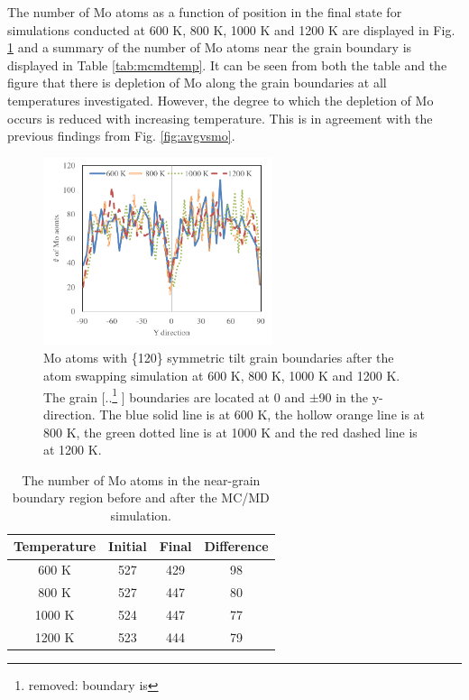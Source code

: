 \documentclass[review]{elsarticle}
\providecommand{\DIFaddtex}[1]{{\protect\color{blue} \sf #1}} %
\providecommand{\DIFdeltex}[1]{{\protect\color{red} [..\footnote{removed: #1} ]}} %
\providecommand{\DIFaddFL}[1]{\DIFadd{#1}} %
\providecommand{\DIFdelFL}[1]{\DIFdel{#1}} %
\providecommand{\DIFaddbeginFL}{} %
\providecommand{\DIFaddendFL}{} %
\providecommand{\DIFdelbeginFL}{} %
\providecommand{\DIFdelendFL}{} %
\providecommand{\DIFadd}[1]{\texorpdfstring{\DIFaddtex{#1}}{#1}} %
\providecommand{\DIFdel}[1]{\texorpdfstring{\DIFdeltex{#1}}{}} %
\newcommand{\DIFscaledelfig}{0.5}
\newlength{\DIFdelgraphicswidth} %
\newlength{\DIFdelgraphicsheight} %
\newcommand{\DIFaddincludegraphics}[2][]{{\color{blue}\fbox{\DIFOincludegraphics[#1]{#2}}}} %
\newcommand{\DIFdelincludegraphics}[2][]{%
\sbox{\DIFdelgraphicsbox}{\DIFOincludegraphics[#1]{#2}}%
\settoboxwidth{\DIFdelgraphicswidth}{\DIFdelgraphicsbox} %
\settoboxtotalheight{\DIFdelgraphicsheight}{\DIFdelgraphicsbox} %
\scalebox{\DIFscaledelfig}{%
\parbox[b]{\DIFdelgraphicswidth}{\usebox{\DIFdelgraphicsbox}\\[-\baselineskip] \rule{\DIFdelgraphicswidth}{0em}}\llap{\resizebox{\DIFdelgraphicswidth}{\DIFdelgraphicsheight}{%
\setlength{\unitlength}{\DIFdelgraphicswidth}%
\begin{picture}(1,1)%
\thicklines\linethickness{2pt} %
{\color[rgb]{1,0,0}\put(0,0){\framebox(1,1){}}}%
{\color[rgb]{1,0,0}\put(0,0){\line( 1,1){1}}}%
{\color[rgb]{1,0,0}\put(0,1){\line(1,-1){1}}}%
\end{picture}%
}\hspace*{3pt}}} %
} %
\DeclareRobustCommand{\DIFaddbeginFL}{\DIFOaddbeginFL \let\includegraphics\DIFaddincludegraphics} %
\DeclareRobustCommand{\DIFaddendFL}{\DIFOaddendFL \let\includegraphics\DIFOincludegraphics} %
\DeclareRobustCommand{\DIFdelbeginFL}{\DIFOdelbeginFL \let\includegraphics\DIFdelincludegraphics} %
\DeclareRobustCommand{\DIFdelendFL}{\DIFOaddendFL \let\includegraphics\DIFOincludegraphics} %
\begin{document}
\FloatBarrier

The number of Mo atoms as a function of position in the final state for simulations conducted at 600 K, 800 K, 1000 K and 1200 K are displayed in Fig. \ref{fig:mcmdtemp} and a summary of the number of Mo atoms near the grain boundary is displayed in Table \ref{tab:mcmdtemp}. It can be seen from both the table and the figure that there is depletion of Mo along the grain boundaries at all temperatures investigated. However, the degree to which the depletion of Mo occurs is reduced with increasing temperature. This is in agreement with the previous findings from Fig. \ref{fig:avgvsmo}. 

\begin{figure}[h]
 \centering
 \includegraphics[width=0.6\textwidth]{mcmdtemp.png} 
 \caption{Mo atoms with \{120\} symmetric tilt grain boundaries after the atom swapping simulation at 600 K, 800 K, 1000 K and 1200 K. The grain \DIFdelbeginFL \DIFdelFL{boundary is }\DIFdelendFL \DIFaddbeginFL \DIFaddFL{boundaries are }\DIFaddendFL located at 0 and $\pm$90 in the y-direction. The blue solid line is at 600 K, the hollow orange line is at 800 K, the green dotted line is at 1000 K and the red dashed line is at 1200 K.}
 \label{fig:mcmdtemp}
\end{figure}

\begin{table}[h]
\caption{The number of Mo atoms in the near-grain boundary region before and after the MC/MD simulation. } \label{tab:mcmdtemp}
\begin{center}
\begin{tabular}{|c|c|c|c|}
	\hline
Temperature & Initial & Final & Difference \\
\hline
600 K & 527 & 429 & 98 \\
800 K & 527 & 447 & 80\\ 
1000 K & 524 & 447 & 77 \\
1200 K & 523 & 444 & 79 \\
 	 \hline
\end{tabular}
\end{center}
\label{default}
\end{table}
\end{document}
